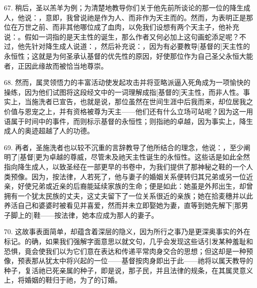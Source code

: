 67. 稍后，圣以羔羊为例；为清楚地教导你们关于他先前所谈论的那一位的降生成人，他说：，意即，我曾说祂是作为人、而非作为天主而的。然而，为表明正是那位在万世之前、而非其他哪位成了血肉，以免我们设想有两个天主子，他补充说：。假如一词指的是天主性的诞生，那么作者又何必加上这句画蛇添足呢？不过，他先针对降生成人说道：，然后补充说：，因为有必要教导[基督的]天主性的永恒性；这就是为何圣承认基督的优先性的原因，好使那位作为自己圣父永恒大能者，正因此缘故而被恰当地尊崇。\par

68. 然而，属灵领悟力的丰富活动使发起攻击并将亚略派逼入死角成为一项愉快的操练，因为他们试图将这段经文中的一词理解成指[基督的]天主性，而非人性。事实上，当施洗者已宣告，也就是说，那位虽然在世间生涯中后我而来，却位居我之价值与恩宠之上，并有资格被尊为天主——他们还有什么立场可站呢？因为这一用语属于时间中的事件，而则标示基督的永恒性；则指祂的卓越，因为事实上，降生成人的奥迹超越了人的功德。\par

69. 再者，圣施洗者也以较不沉重的言辞教导了他所结合的理念，他说：，至少阐明了[基督]更为卓越的尊威，尽管未及祂天主性诞生的永恒性。这些话是如此全然指向降生成人，以致圣经在一部更早的书卷中，为我们提供了那神秘之鞋的一个人类预像。因为，按法律，人若死了，他与妻子的婚姻关系便转归其兄弟或另一位近亲，好使兄弟或近亲的后裔能延续家族的生命；便是如此：她虽是外邦出生，却曾拥有一个犹太民族的丈夫，这丈夫留下了一位关系很近的亲族；她在拾麦穗并以此养活自己和婆婆时被看见并喜爱，然而并未立即娶她为妻，直等到她先解下[那男子脚上的]鞋——按法律，她本应成为那人的妻子。\par

70. 这故事表面简单，却蕴含着深层的隐义，因为所行之事乃是更深奥事实的外在标记。的确，如果我们强解字面意思以就文句，几乎会发现这些话引发某种羞耻和恐惧，竟会使我们以为它们意在表达和传递平常肉身交合的思想；但这却是一种预像，预表那从犹太中将兴起的一位——基督按肉身即出于此——祂将以属天教导的种子，复活祂已死亲属的种子，即是说，那子民，并且法律的规条，在其属灵意义上，将婚姻的鞋归于祂，为了的订婚。\par

